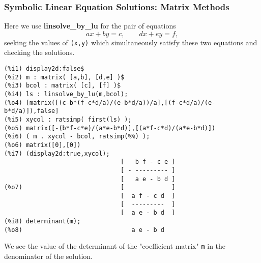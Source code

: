 \documentclass[12pt]{article}
\begin{document}
\subsubsection{Symbolic Linear Equation Solutions: Matrix Methods}
Here we use \textbf{linsolve\_by\_lu} for the pair of equations
$$ a x + b y = c, \qquad  d x + e y = f, $$	
  seeking the values of \verb|(x,y)| which simultaneously
  satisfy these two equations and checking the solutions.
\small
\begin{verbatim}
(%i1) display2d:false$
(%i2) m : matrix( [a,b], [d,e] )$
(%i3) bcol : matrix( [c], [f] )$
(%i4) ls : linsolve_by_lu(m,bcol);
(%o4) [matrix([(c-b*(f-c*d/a)/(e-b*d/a))/a],[(f-c*d/a)/(e-b*d/a)]),false]
(%i5) xycol : ratsimp( first(ls) );
(%o5) matrix([-(b*f-c*e)/(a*e-b*d)],[(a*f-c*d)/(a*e-b*d)])
(%i6) ( m . xycol - bcol, ratsimp(%%) );
(%o6) matrix([0],[0])
(%i7) (display2d:true,xycol);
                                [   b f - c e ]
                                [ - --------- ]
                                [   a e - b d ]
(%o7)                           [             ]
                                [  a f - c d  ]
                                [  ---------  ]
                                [  a e - b d  ]
(%i8) determinant(m);
(%o8)                              a e - b d								
\end{verbatim}
\normalsize
We see the value of the determinant of the "coefficient matrix" \verb|m|
  in the denominator of the solution.
\end{document}
